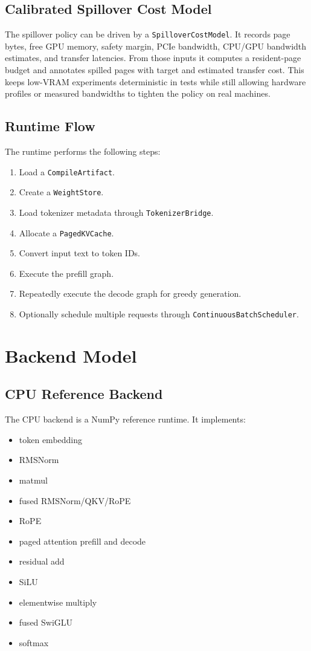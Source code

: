 \documentclass[11pt]{article}
\begin{document}
\subsection{Calibrated Spillover Cost Model}

The spillover policy can be driven by a \texttt{SpilloverCostModel}. It records
page bytes, free GPU memory, safety margin, PCIe bandwidth, CPU/GPU bandwidth
estimates, and transfer latencies. From those inputs it computes a resident-page
budget and annotates spilled pages with target and estimated transfer cost. This
keeps low-VRAM experiments deterministic in tests while still allowing hardware
profiles or measured bandwidths to tighten the policy on real machines.

\subsection{Runtime Flow}

The runtime performs the following steps:

\begin{enumerate}[leftmargin=*]
  \item Load a \texttt{CompileArtifact}.
  \item Create a \texttt{WeightStore}.
  \item Load tokenizer metadata through \texttt{TokenizerBridge}.
  \item Allocate a \texttt{PagedKVCache}.
  \item Convert input text to token IDs.
  \item Execute the prefill graph.
  \item Repeatedly execute the decode graph for greedy generation.
  \item Optionally schedule multiple requests through
        \texttt{ContinuousBatchScheduler}.
\end{enumerate}

\section{Backend Model}

\subsection{CPU Reference Backend}

The CPU backend is a NumPy reference runtime. It implements:

\begin{itemize}[leftmargin=*]
  \item token embedding
  \item RMSNorm
  \item matmul
  \item fused RMSNorm/QKV/RoPE
  \item RoPE
  \item paged attention prefill and decode
  \item residual add
  \item SiLU
  \item elementwise multiply
  \item fused SwiGLU
  \item softmax
\end{itemize}
\end{document}
